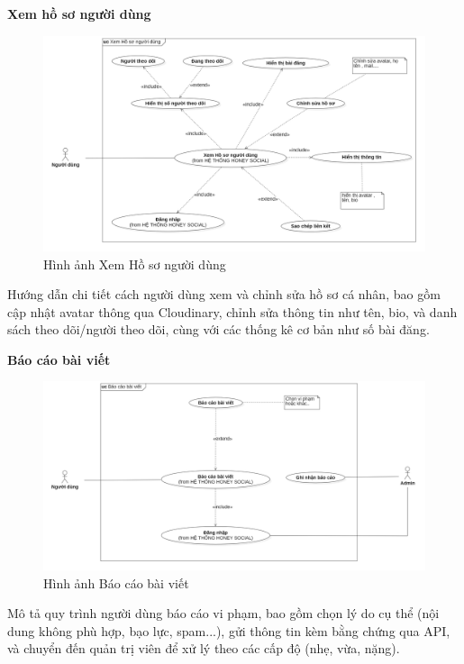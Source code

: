 \newpage
\textbf{Xem hồ sơ người dùng} \\
\begin{figure}[H]
    \centering
    \includegraphics[width=1\textwidth]{image/MoHinh/5.png}
    \caption{Hình ảnh Xem Hồ sơ người dùng}
    \label{fig:xem_ho_so_nguoi_dung}
\end{figure}
Hướng dẫn chi tiết cách người dùng xem và chỉnh sửa hồ sơ cá nhân, bao gồm cập nhật avatar thông qua Cloudinary, chỉnh sửa thông tin như tên, bio, và danh sách theo dõi/người theo dõi, cùng với các thống kê cơ bản như số bài đăng.

\textbf{Báo cáo bài viết} \\
\begin{figure}[H]
    \centering
    \includegraphics[width=1\textwidth]{image/MoHinh/6.png}
    \caption{Hình ảnh Báo cáo bài viết}
    \label{fig:bao_cao_bai_viet}
\end{figure}
Mô tả quy trình người dùng báo cáo vi phạm, bao gồm chọn lý do cụ thể (nội dung không phù hợp, bạo lực, spam...), gửi thông tin kèm bằng chứng qua API, và chuyển đến quản trị viên để xử lý theo các cấp độ (nhẹ, vừa, nặng).

